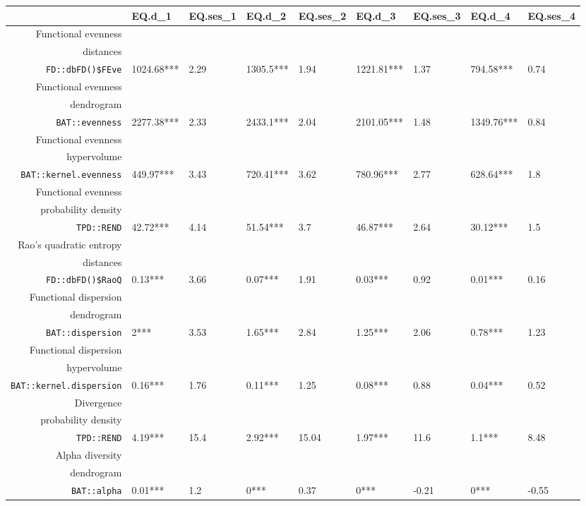 \begin{table}[ht]
\scriptsize
\centering
\begin{tabular}{rllllllll}
  \hline
 & EQ.d\_1 & EQ.ses\_1 & EQ.d\_2 & EQ.ses\_2 & EQ.d\_3 & EQ.ses\_3 & EQ.d\_4 & EQ.ses\_4 \\ 
  \hline
Functional evenness\\distances\\\texttt{FD::dbFD()\$FEve} & 1024.68*** & 2.29 & 1305.5*** & 1.94 & 1221.81*** & 1.37 & 794.58*** & 0.74 \\ 
  Functional evenness\\dendrogram\\\texttt{BAT::evenness} & 2277.38*** & 2.33 & 2433.1*** & 2.04 & 2101.05*** & 1.48 & 1349.76*** & 0.84 \\ 
  Functional evenness\\hypervolume\\\texttt{BAT::kernel.evenness} & 449.97*** & 3.43 & 720.41*** & 3.62 & 780.96*** & 2.77 & 628.64*** & 1.8 \\ 
  Functional evenness\\probability density\\\texttt{TPD::REND} & 42.72*** & 4.14 & 51.54*** & 3.7 & 46.87*** & 2.64 & 30.12*** & 1.5 \\ 
  Rao's quadratic entropy\\distances\\\texttt{FD::dbFD()\$RaoQ} & 0.13*** & 3.66 & 0.07*** & 1.91 & 0.03*** & 0.92 & 0.01*** & 0.16 \\ 
  Functional dispersion\\dendrogram\\\texttt{BAT::dispersion} & 2*** & 3.53 & 1.65*** & 2.84 & 1.25*** & 2.06 & 0.78*** & 1.23 \\ 
  Functional dispersion\\hypervolume\\\texttt{BAT::kernel.dispersion} & 0.16*** & 1.76 & 0.11*** & 1.25 & 0.08*** & 0.88 & 0.04*** & 0.52 \\ 
  Divergence\\probability density\\\texttt{TPD::REND} & 4.19*** & 15.4 & 2.92*** & 15.04 & 1.97*** & 11.6 & 1.1*** & 8.48 \\ 
  Alpha diversity\\dendrogram\\\texttt{BAT::alpha} & 0.01*** & 1.2 & 0*** & 0.37 & 0*** & -0.21 & 0*** & -0.55 \\ 

\end{tabular}
\end{table}
